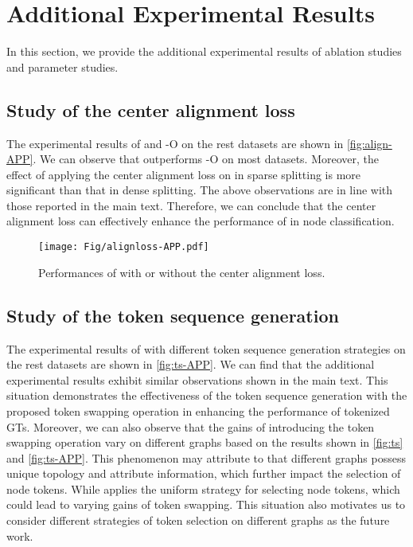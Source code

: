 \section{Additional Experimental Results}\label{app:exp-results}
In this section, we provide the additional experimental results of ablation studies and parameter studies.




\subsection{Study of the center alignment loss}\label{app:exp-ca}
The experimental results of \name and \name-O on the rest datasets are shown in \autoref{fig:align-APP}.
We can observe that \name outperforms \name-O on most datasets.
Moreover, the effect of applying the center alignment loss on \name in sparse splitting is more significant than that in dense splitting.
The above observations are in line with those reported in the main text.
Therefore, we can conclude that the center alignment loss can effectively enhance the performance of \name in node classification.


\begin{figure}[ht]
\centering
\texttt{[image: Fig/alignloss-APP.pdf]}
\caption{
Performances of \name with or without the center alignment loss.
}
\label{fig:align-APP}
\end{figure}




\subsection{Study of the token sequence generation}\label{app:exp-ts}
The experimental results of \name with different token sequence generation strategies on the rest datasets are shown in \autoref{fig:ts-APP}.
We can find that the additional experimental results exhibit similar observations shown in the main text.
This situation demonstrates the effectiveness of the token sequence generation with the proposed token swapping operation in enhancing the performance of tokenized GTs.
Moreover, we can also observe that the gains of introducing the token swapping operation vary on different graphs based on the results shown in \autoref{fig:ts} and \autoref{fig:ts-APP}.
This phenomenon may attribute to that different graphs possess unique topology and attribute information, which further impact the selection of node tokens. 
While \name applies the uniform strategy for selecting node tokens, which could lead to varying gains of token swapping.
This situation also motivates us to consider different strategies of token selection on different graphs as the future work.


